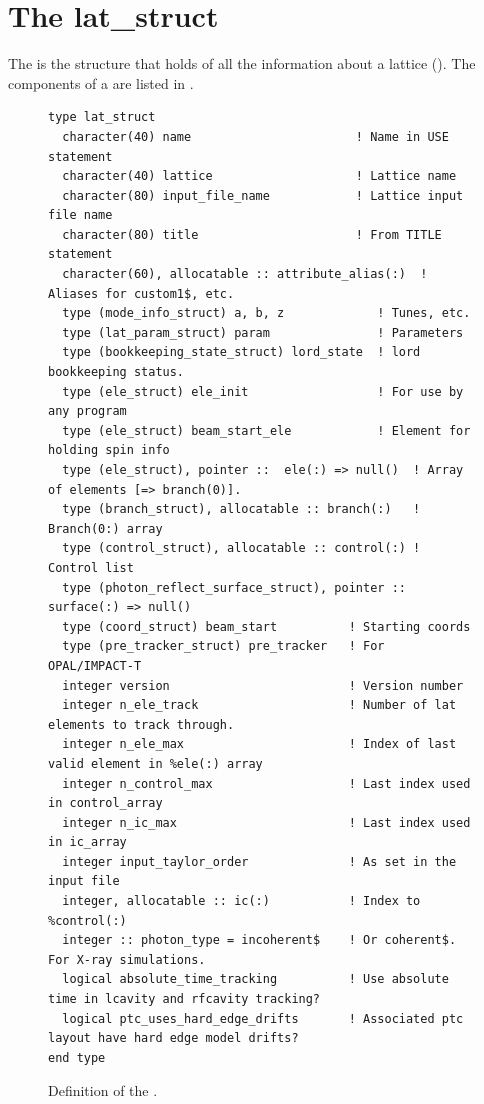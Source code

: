 \chapter{The lat_struct}
\label{c:lat.struct}

The  is the structure that holds of all the information
about a lattice (). The components of a
 are listed in .
\begin{figure}[htb]
\centering
\begin{verbatim}
type lat_struct
  character(40) name                       ! Name in USE statement
  character(40) lattice                    ! Lattice name
  character(80) input_file_name            ! Lattice input file name
  character(80) title                      ! From TITLE statement
  character(60), allocatable :: attribute_alias(:)  ! Aliases for custom1$, etc.
  type (mode_info_struct) a, b, z             ! Tunes, etc.                       
  type (lat_param_struct) param               ! Parameters                        
  type (bookkeeping_state_struct) lord_state  ! lord bookkeeping status.          
  type (ele_struct) ele_init                  ! For use by any program            
  type (ele_struct) beam_start_ele            ! Element for holding spin info     
  type (ele_struct), pointer ::  ele(:) => null()  ! Array of elements [=> branch(0)].
  type (branch_struct), allocatable :: branch(:)   ! Branch(0:) array
  type (control_struct), allocatable :: control(:) ! Control list
  type (photon_reflect_surface_struct), pointer :: surface(:) => null()
  type (coord_struct) beam_start          ! Starting coords
  type (pre_tracker_struct) pre_tracker   ! For OPAL/IMPACT-T
  integer version                         ! Version number
  integer n_ele_track                     ! Number of lat elements to track through.
  integer n_ele_max                       ! Index of last valid element in %ele(:) array
  integer n_control_max                   ! Last index used in control_array
  integer n_ic_max                        ! Last index used in ic_array
  integer input_taylor_order              ! As set in the input file
  integer, allocatable :: ic(:)           ! Index to %control(:)
  integer :: photon_type = incoherent$    ! Or coherent$. For X-ray simulations.
  logical absolute_time_tracking          ! Use absolute time in lcavity and rfcavity tracking?
  logical ptc_uses_hard_edge_drifts       ! Associated ptc layout have hard edge model drifts?
end type
\end{verbatim}
\caption{Definition of the .}
\label{f:lat.struct}
\end{figure}

